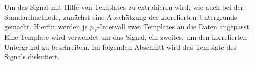 Um das Signal mit Hilfe von Templates zu extrahieren wird, wie auch bei der Standardmethode, zunächst eine Abschätzung des korrelierten Untergrunds gemacht.
Hierfür werden je $p_\text{T}$-Intervall zwei Templates an die Daten angepasst.
Eine Template wird verwendet um das Signal, ein zweites, um den korrelierten Untergrund zu beschreiben.
\newline
Im folgenden Abschnitt wird das Template des Signals diskutiert. 